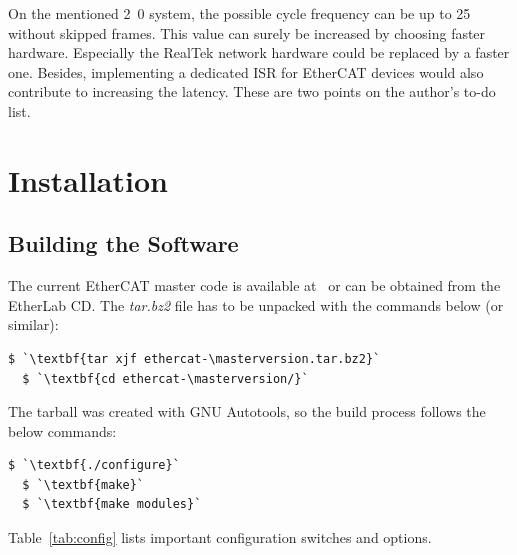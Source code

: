 \documentclass[a4paper,12pt,BCOR6mm,bibtotoc,idxtotoc]{scrbook}
\newcommand{\masterversion}{1.4.0}
\begin{document}
On the mentioned \unit{2.0}{\giga\hertz} system, the possible cycle frequency
can be up to \unit{25}{\kilo\hertz} without skipped frames. This value can
surely be increased by choosing faster hardware. Especially the RealTek
network hardware could be replaced by a faster one. Besides, implementing a
dedicated ISR for EtherCAT devices would also contribute to increasing the
latency. These are two points on the author's to-do list.


\chapter{Installation}
\label{sec:installation}

\section{Building the Software}

The current EtherCAT master code is available at~\cite{etherlab} or can be
obtained from the EtherLab CD. The \textit{tar.bz2} file has to be unpacked
with the commands below (or similar):

\begin{lstlisting}[gobble=2]
  $ `\textbf{tar xjf ethercat-\masterversion.tar.bz2}`
  $ `\textbf{cd ethercat-\masterversion/}`
\end{lstlisting}

The tarball was created with GNU Autotools, so the build process
follows the below commands:

\begin{lstlisting}[gobble=2]
  $ `\textbf{./configure}`
  $ `\textbf{make}`
  $ `\textbf{make modules}`
\end{lstlisting}

Table~\ref{tab:config} lists important configuration switches and options.
\end{document}
